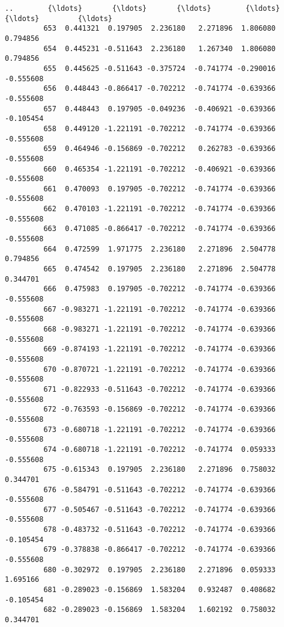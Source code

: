 \documentclass[11pt]{article}
\begin{document}
\begin{Verbatim}[commandchars=\\\{\}]
         ..        {\ldots}       {\ldots}       {\ldots}        {\ldots}       {\ldots}         {\ldots}   
         653  0.441321  0.197905  2.236180   2.271896  1.806080    0.794856   
         654  0.445231 -0.511643  2.236180   1.267340  1.806080    0.794856   
         655  0.445625 -0.511643 -0.375724  -0.741774 -0.290016   -0.555608   
         656  0.448443 -0.866417 -0.702212  -0.741774 -0.639366   -0.555608   
         657  0.448443  0.197905 -0.049236  -0.406921 -0.639366   -0.105454   
         658  0.449120 -1.221191 -0.702212  -0.741774 -0.639366   -0.555608   
         659  0.464946 -0.156869 -0.702212   0.262783 -0.639366   -0.555608   
         660  0.465354 -1.221191 -0.702212  -0.406921 -0.639366   -0.555608   
         661  0.470093  0.197905 -0.702212  -0.741774 -0.639366   -0.555608   
         662  0.470103 -1.221191 -0.702212  -0.741774 -0.639366   -0.555608   
         663  0.471085 -0.866417 -0.702212  -0.741774 -0.639366   -0.555608   
         664  0.472599  1.971775  2.236180   2.271896  2.504778    0.794856   
         665  0.474542  0.197905  2.236180   2.271896  2.504778    0.344701   
         666  0.475983  0.197905 -0.702212  -0.741774 -0.639366   -0.555608   
         667 -0.983271 -1.221191 -0.702212  -0.741774 -0.639366   -0.555608   
         668 -0.983271 -1.221191 -0.702212  -0.741774 -0.639366   -0.555608   
         669 -0.874193 -1.221191 -0.702212  -0.741774 -0.639366   -0.555608   
         670 -0.870721 -1.221191 -0.702212  -0.741774 -0.639366   -0.555608   
         671 -0.822933 -0.511643 -0.702212  -0.741774 -0.639366   -0.555608   
         672 -0.763593 -0.156869 -0.702212  -0.741774 -0.639366   -0.555608   
         673 -0.680718 -1.221191 -0.702212  -0.741774 -0.639366   -0.555608   
         674 -0.680718 -1.221191 -0.702212  -0.741774  0.059333   -0.555608   
         675 -0.615343  0.197905  2.236180   2.271896  0.758032    0.344701   
         676 -0.584791 -0.511643 -0.702212  -0.741774 -0.639366   -0.555608   
         677 -0.505467 -0.511643 -0.702212  -0.741774 -0.639366   -0.555608   
         678 -0.483732 -0.511643 -0.702212  -0.741774 -0.639366   -0.105454   
         679 -0.378838 -0.866417 -0.702212  -0.741774 -0.639366   -0.555608   
         680 -0.302972  0.197905  2.236180   2.271896  0.059333    1.695166   
         681 -0.289023 -0.156869  1.583204   0.932487  0.408682   -0.105454   
         682 -0.289023 -0.156869  1.583204   1.602192  0.758032    0.344701   
         

\end{Verbatim}
\end{document}
